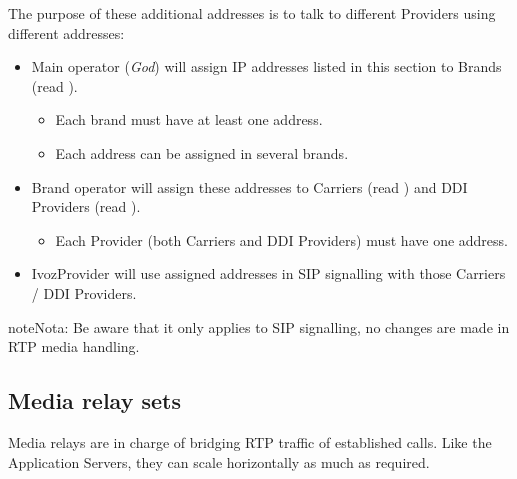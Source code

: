 \documentclass[letterpaper,10pt,spanish]{sphinxmanual}
\begin{document}
The purpose of these additional addresses is to talk to different Providers using different addresses:
\begin{itemize}
\item {} 
Main operator (\emph{God}) will assign IP addresses listed in this section to Brands (read {\hyperref[administration_portal/platform/brands:brands]{}}).
\begin{itemize}
\item {} 
Each brand must have at least one address.

\item {} 
Each address can be assigned in several brands.

\end{itemize}

\item {} 
Brand operator will assign these addresses to Carriers (read {\hyperref[administration_portal/brand/providers/carriers:carriers]{}}) and DDI Providers (read {\hyperref[administration_portal/brand/providers/ddi_providers:ddi\string-providers]{}}).
\begin{itemize}
\item {} 
Each Provider (both Carriers and DDI Providers) must have one address.

\end{itemize}

\item {} 
IvozProvider will use assigned addresses in SIP signalling with those Carriers / DDI Providers.

\end{itemize}

\begin{notice}{note}{Nota:}
Be aware that it only applies to SIP signalling, no changes are made in RTP media handling.
\end{notice}


\subsection{Media relay sets}
\label{administration_portal/platform/infrastructure/media_relay_sets::doc}\label{administration_portal/platform/infrastructure/media_relay_sets:media-relay-sets}
Media relays are in charge of bridging RTP traffic of established calls. Like
the Application Servers, they can scale horizontally as much as required.
\end{document}
